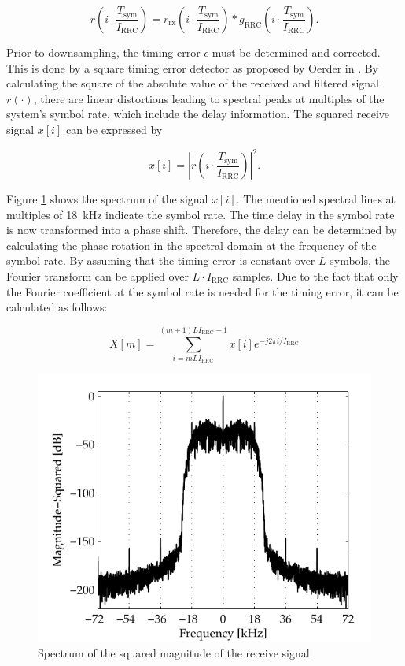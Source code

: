 \begin{equation}
r\left( i \cdot \frac{T_\text{sym}}{I_\text{RRC}}\right) = r_\text{rx} \left( i \cdot \frac{T_\text{sym}}{I_\text{RRC}} \right) * g_{\text{RRC}} \left( i \cdot \frac{T_\text{sym}}{I_\text{RRC}} \right).
\end{equation}

Prior to downsampling, the timing error $\epsilon$ must be determined and corrected. This is done by a square timing error detector as proposed by Oerder in \cite{oerder}. By calculating the square of the absolute value of the received and filtered signal $r(\cdot)$, there are linear distortions leading to spectral peaks at multiples of the system's symbol rate, which include the delay information. The squared receive signal $x[i]$ can be expressed by

\begin{equation}
x[i] = \left|r\left( i \cdot \frac{T_\text{sym}}{I_\text{RRC}}\right) \right|^2.
\end{equation}

Figure \ref{fig:square_time} shows the spectrum of the signal $x[i]$. The mentioned spectral lines at multiples of \SI{18}{kHz} indicate the symbol rate. The time delay in the symbol rate is now transformed into a phase shift. Therefore, the delay can be determined by calculating the phase rotation in the spectral domain at the frequency of the symbol rate. By assuming that the timing error is constant over $L$ symbols, the Fourier transform can be applied over $L \cdot I_\text{RRC}$ samples. Due to the fact that only the Fourier coefficient at the symbol rate is needed for the timing error, it can be calculated as follows:

\begin{equation}
X[m] =  \sum_{i=mLI_\text{RRC}}^{(m+1)LI_\text{RRC}-1} x[i] e^{-j 2 \pi i/I_\text{RRC}}
\end{equation}


\begin{figure}[htb]
	\centering
		\includegraphics{../kapitel04/figures/square_time.pdf}
	\caption{Spectrum of the squared magnitude of the receive signal}
	\label{fig:square_time}
\end{figure}

